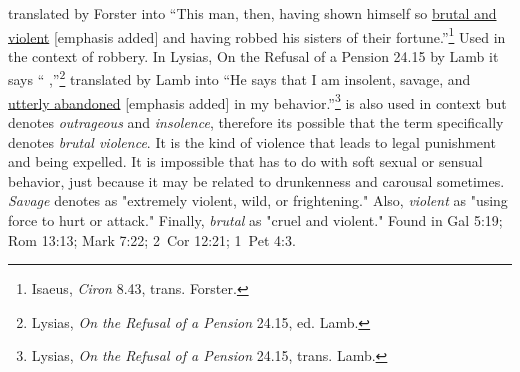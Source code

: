 translated by Forster into ``This man, then, having shown himself so \underline{brutal and violent} [emphasis added] and having robbed his sisters of their fortune.''\footnote{Isaeus, \emph{Ciron} 8.43, trans. Forster.} Used in the context of robbery. 
In Lysias, On the Refusal of a Pension 24.15 by Lamb it says `` \underline{} ,''\footnote{Lysias, \emph{On the Refusal of a Pension} 24.15, ed. Lamb.}
translated by Lamb into ``He says that I am insolent, savage, and \underline{utterly abandoned} [emphasis added] in my behavior.''\footnote{Lysias, \emph{On the Refusal of a Pension} 24.15, trans. Lamb.}  
 is also used in context but denotes \emph{outrageous} and \emph{insolence}, therefore its possible that the term specifically denotes \emph{brutal violence}. It is the kind of violence that leads to legal punishment and being expelled. It is impossible that  has to do with soft sexual or sensual behavior, just because it may be related to drunkenness and carousal sometimes. \emph{Savage} denotes as "extremely violent, wild, or frightening." Also, \emph{violent} as "using force to hurt or attack." Finally, \emph{brutal} as "cruel and violent."
Found in Gal 5:19; Rom 13:13; Mark 7:22; 2~Cor 12:21; 1~Pet 4:3.
